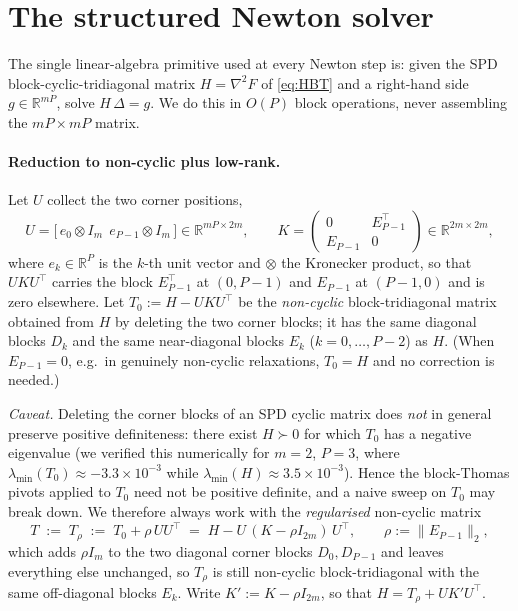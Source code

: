 \documentclass{amsart}
\newcommand{\R}{\mathbb{R}}
\begin{document}
\section{The structured Newton solver}\label{sec:linalg}

The single linear-algebra primitive used at every Newton step is: given the SPD
block-cyclic-tridiagonal matrix $H=\nabla^2F$ of \eqref{eq:HBT} and a right-hand
side $g\in\R^{mP}$, solve $H\,\Delta=g$. We do this in $O(P)$ block operations,
never assembling the $mP\times mP$ matrix.

\paragraph{Reduction to non-cyclic plus low-rank.}
Let $U$ collect the two corner positions,
\begin{equation}\label{eq:UKV}
  U=\big[\,e_{0}\otimes I_m\ \ e_{P-1}\otimes I_m\,\big]\in\R^{mP\times2m},
  \qquad
  K=\begin{pmatrix}0 & E_{P-1}^{\!\top}\\ E_{P-1} & 0\end{pmatrix}\in\R^{2m\times2m},
\end{equation}
where $e_k\in\R^{P}$ is the $k$-th unit vector and $\otimes$ the Kronecker product,
so that $UKU^{\!\top}$ carries the block $E_{P-1}^{\!\top}$ at $(0,P-1)$ and $E_{P-1}$
at $(P-1,0)$ and is zero elsewhere. Let $T_0:=H-UKU^{\!\top}$ be the \emph{non-cyclic}
block-tridiagonal matrix obtained from $H$ by deleting the two corner blocks; it has
the same diagonal blocks $D_k$ and the same near-diagonal blocks $E_k$
($k=0,\dots,P-2$) as $H$. (When $E_{P-1}=0$, e.g.\ in genuinely non-cyclic
relaxations, $T_0=H$ and no correction is needed.)

\emph{Caveat.} Deleting the corner blocks of an SPD cyclic matrix does \emph{not} in
general preserve positive definiteness: there exist $H\succ0$ for which $T_0$ has a
negative eigenvalue (we verified this numerically for $m=2$, $P=3$, where
$\lambda_{\min}(T_0)\approx-3.3\times10^{-3}$ while $\lambda_{\min}(H)\approx
3.5\times10^{-3}$). Hence the block-Thomas pivots applied to $T_0$ need not be
positive definite, and a naive sweep on $T_0$ may break down. We therefore always
work with the \emph{regularised} non-cyclic matrix
\begin{equation}\label{eq:Trho}
  T \;:=\; T_\rho \;:=\; T_0+\rho\,UU^{\!\top}
        \;=\; H - U\,(K-\rho I_{2m})\,U^{\!\top},
  \qquad \rho:=\|E_{P-1}\|_2,
\end{equation}
which adds $\rho I_m$ to the two diagonal corner blocks $D_0,D_{P-1}$ and leaves
everything else unchanged, so $T_\rho$ is still non-cyclic block-tridiagonal with the
same off-diagonal blocks $E_k$. Write $K':=K-\rho I_{2m}$, so that
$H=T_\rho+UK'U^{\!\top}$.
\end{document}
